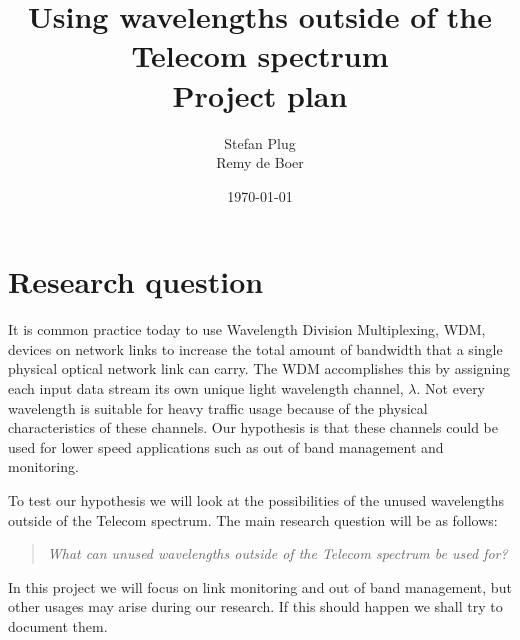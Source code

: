 \documentclass{article}
\begin{document}
\title{Using wavelengths outside of the Telecom spectrum\\Project plan}
\author{Stefan Plug\\Remy de Boer}
\date{\today}
\maketitle

\section{Research question}
It is common practice today to use Wavelength Division Multiplexing, WDM, devices on network links to increase the total amount of bandwidth that a single physical optical network link can carry. The WDM accomplishes this by assigning each input data stream its own unique light wavelength channel, $\lambda$. 
Not every wavelength is suitable for heavy traffic usage because of the physical characteristics of these channels. Our hypothesis is that these channels could be used for lower speed applications such as out of band management and monitoring.

To test our hypothesis we will look at the possibilities of the unused wavelengths outside of the Telecom spectrum.
The main research question will be as follows:
\begin{quote}
\textit{
What can unused wavelengths outside of the Telecom spectrum be used for?
}
\end{quote}

In this project we will focus on link monitoring and out of band management, but other usages may arise during our research. If this should happen we shall try to document them. 


\begin{comment}
The main symptom that a fibre optic link is degrading is an increase of the Bit Error Rate, BER.
The main goal of any network design should be to reduce the number of bit errors as much as possible.
An increase in the BER is never a cause in itself but is always the product of one or more underlying causes such as attenuation, scattering, or dispersion. To help us understand what these causes are and what values can be considered normal we shall try to answer the following sub-question:
\begin{quote}
\textit{
What charictaristics can we monitor over time which could indicate a future increase in BER?
}
\end{quote}
When we know what the causes of BER are and how these can be monitored then we can try to implement this for ourselves using the 1625nm channel in a proof of concept set up. 
While implementing this proof of concept we should use our findings of the previous sub-question to send the user some kind of automated warning when the values of one or more of the measured statistics drifts outside of the normal range.

\end{comment}
\end{document}

